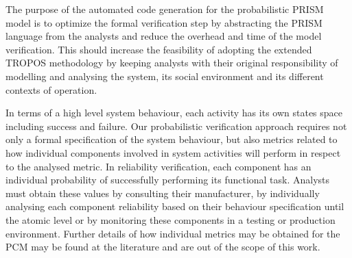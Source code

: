 The purpose  of the automated code generation for the probabilistic PRISM model is to optimize the formal verification step by abstracting the PRISM language from the analysts and reduce the overhead and time of the model verification. This should increase the feasibility of adopting the extended TROPOS methodology by keeping analysts with their original responsibility of modelling and analysing the system, its social environment and its different contexts of operation.






In terms of a high level system behaviour, each activity has its own states space including success and failure. Our probabilistic verification approach requires not only a formal specification of the system behaviour, but also metrics related to how individual components involved in system activities will perform in respect to the analysed metric. In reliability verification, each component has an individual probability of successfully performing its functional task. Analysts must obtain these values by consulting their manufacturer, by individually analysing each component reliability based on their behaviour specification until the atomic level or by monitoring these components in a testing or production environment. Further details of how individual metrics may be obtained for the PCM may be found at the literature and are out of the scope of this work.
